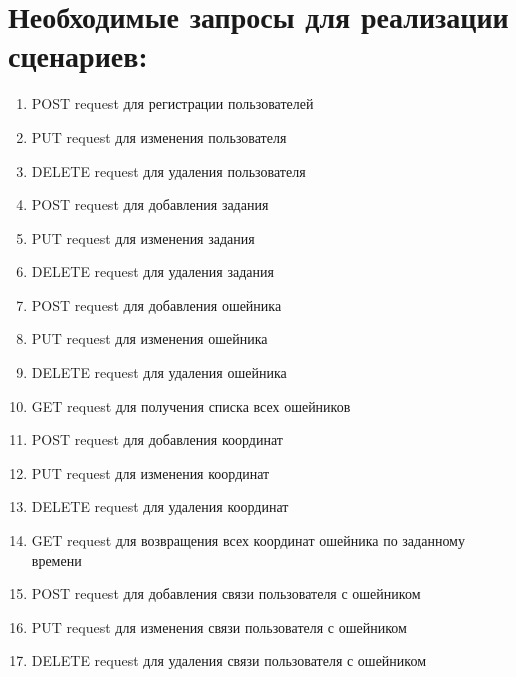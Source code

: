 \documentclass[letterpaper,10pt,russian]{sphinxmanual}
\begin{document}
\chapter{Необходимые запросы для реализации сценариев:}
\label{\detokenize{README:id3}}\begin{enumerate}
%
\item {} 
\sphinxAtStartPar
POST request для регистрации пользователей

\item {} 
\sphinxAtStartPar
PUT request для изменения пользователя

\item {} 
\sphinxAtStartPar
DELETE request для удаления пользователя

\item {} 
\sphinxAtStartPar
POST request для добавления задания

\item {} 
\sphinxAtStartPar
PUT request для изменения задания

\item {} 
\sphinxAtStartPar
DELETE request для удаления задания

\item {} 
\sphinxAtStartPar
POST request для добавления ошейника

\item {} 
\sphinxAtStartPar
PUT request для изменения ошейника

\item {} 
\sphinxAtStartPar
DELETE request для удаления ошейника

\item {} 
\sphinxAtStartPar
GET request для получения списка всех ошейников

\item {} 
\sphinxAtStartPar
POST request для добавления координат

\item {} 
\sphinxAtStartPar
PUT request для изменения координат

\item {} 
\sphinxAtStartPar
DELETE request для удаления координат

\item {} 
\sphinxAtStartPar
GET request для возвращения всех координат ошейника по заданному времени

\item {} 
\sphinxAtStartPar
POST request для добавления связи пользователя с ошейником

\item {} 
\sphinxAtStartPar
PUT request для изменения связи пользователя с ошейником

\item {} 
\sphinxAtStartPar
DELETE request для удаления связи пользователя с ошейником

\end{enumerate}
\end{document}
